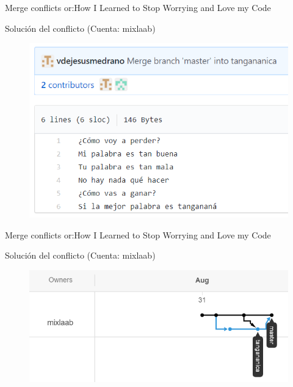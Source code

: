 \documentclass[10pt]{beamer}
\begin{document}
\begin{frame}{Merge conflicts or:}{How I Learned to Stop Worrying and Love my Code \heartsuit}

\begin{block}{Solución del conflicto (Cuenta: mixlaab)}

\begin{figure}[h!]
\centering
\includegraphics [scale=0.25]{final1}
\label{fig:issues}
\end{figure}
    
\end{block}

\end{frame}

\begin{frame}{Merge conflicts or:}{How I Learned to Stop Worrying and Love my Code \heartsuit}

\begin{block}{Solución del conflicto (Cuenta: mixlaab)}

\begin{figure}[h!]
\centering
\includegraphics [scale=0.45]{final2}
\label{fig:issues}
\end{figure}
    
\end{block}

\end{frame}
\end{document}

